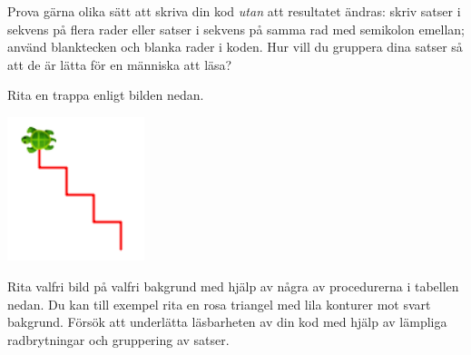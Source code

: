 \noindent Prova gärna olika sätt att skriva din kod \emph{utan} att resultatet ändras: skriv satser i sekvens på flera rader eller satser i sekvens på samma rad med semikolon emellan; använd blanktecken och blanka rader i koden. Hur vill du gruppera dina satser så att de är lätta för en människa att läsa?


\Subtask Rita en trappa enligt bilden nedan.

\includegraphics[width=0.3\textwidth]{../img/kojo/stairs}

\Subtask Rita valfri bild på valfri bakgrund med hjälp av några av procedurerna i tabellen nedan. Du kan till exempel rita en rosa triangel med lila konturer mot svart bakgrund. %
Försök att underlätta läsbarheten av din kod med hjälp av lämpliga radbrytningar och gruppering av satser.


